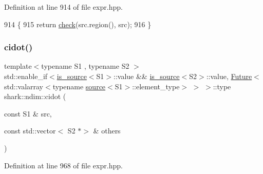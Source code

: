 Definition at line 914 of file expr.\+hpp.


\begin{DoxyCode}
914                                         \{
915             \textcolor{keywordflow}{return} \hyperlink{namespaceshark_1_1ndim_ac4c2c304de61ac4b22c8b266c1627db8}{check}(src.region(), src);
916         \}
\end{DoxyCode}
\hypertarget{namespaceshark_1_1ndim_aae51185f130890d0d852dbafb8efd05b}{}\label{namespaceshark_1_1ndim_aae51185f130890d0d852dbafb8efd05b} 
\subsubsection{\texorpdfstring{cidot()}{cidot()}}
{\footnotesize\ttfamily template$<$typename S1 , typename S2 $>$ \\
std\+::enable\+\_\+if$<$\hyperlink{classshark_1_1ndim_1_1is__source}{is\+\_\+source}$<$S1$>$\+::value \&\& \hyperlink{classshark_1_1ndim_1_1is__source}{is\+\_\+source}$<$S2$>$\+::value, \hyperlink{structshark_1_1_future}{Future}$<$std\+::valarray$<$typename \hyperlink{structshark_1_1ndim_1_1source}{source}$<$S1$>$\+::element\+\_\+type$>$ $>$ $>$\+::type shark\+::ndim\+::cidot (\begin{DoxyParamCaption}\item[{const S1 \&}]{src,  }\item[{const std\+::vector$<$ S2 $\ast$$>$ \&}]{others }\end{DoxyParamCaption})}



Definition at line 968 of file expr.\+hpp.



